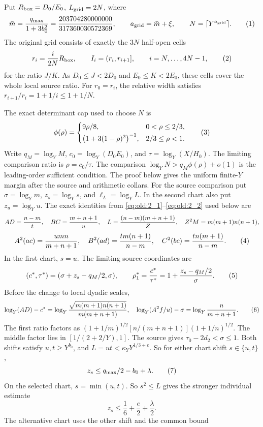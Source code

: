 Put \(R_{\rm box}=D_0/E_0\), \(L_{\rm grid}=2N\), where
\[
 \bar m=\frac{q_{\max}}{1+3b_0^2}
       =\frac{203704280000000}{317360030572369},\qquad
 a_{\rm grid}=\bar m+\xi,\qquad N=\lceil Y^{a_{\rm grid}}\rceil.
\AutoTag{eq:old:7_6}
\]
The original grid consists of exactly the \(3N\) half-open cells
\[
 r_i=\frac{i}{2N}R_{\rm box},\qquad I_i=(r_i,r_{i+1}],
 \qquad i=N,\ldots,4N-1,
\AutoTag{eq:old:7_7}
\]
for the ratio \(J/K\). As \(D_0\le J<2D_0\) and
\(E_0\le K<2E_0\), these cells cover the whole local source ratio.
For \(r_0=r_i\), the relative width satisfies
\(r_{i+1}/r_i=1+1/i\le1+1/N\).

The exact determinant cap used to choose \(N\) is
\[
 \phi(\rho)=
 \begin{cases}
  9\rho/8,&0<\rho\le2/3,\\[2pt]
  \bigl(1+3(1-\rho)^2\bigr)^{-1},&2/3\le\rho<1.
 \end{cases}
\AutoTag{eq:old:7_8}
\]
Write \(q_M=\log_Y M\), \(c_0=\log_Y(D_0E_0)\), and
\(\tau=\log_Y(X/H_0)\). The limiting comparison ratio is
\(\rho=c_0/\tau\). The comparison
\(\log_YN>q_M\phi(\rho)+o(1)\) is the leading-order sufficient
condition. The proof below gives the uniform finite-\(Y\) margin after
the source and arithmetic collars. For the source comparison put
\(\sigma=\log_Ym\), \(z_s=\log_Ys\), and
\(\ell_L=\log_YL\). In the second chart also put
\(z_u=\log_Yu\). The exact identities from \eqref{eq:old:2_1}--\eqref{eq:old:2_2} used below are
\[
 AD={n-m\over t},\quad BC={m+n+1\over u},\quad
 L={(n-m)(m+n+1)\over Z},\quad Z^2M=m(m+1)n(n+1),
\]
\[
 A^2(ac)={umn\over m+n+1},\quad
 B^2(ad)={tm(n+1)\over n-m},\quad
 C^2(bc)={tn(m+1)\over n-m}.
\AutoTag{eq:old:7_8a}
\]
In the first chart, \(s=u\). The limiting source coordinates are
\[
 (c^*,\tau^*)=(\sigma+z_s-q_M/2,\sigma),
\qquad \rho_1^*={c^*\over\tau^*}
 =1+{z_s-q_M/2\over\sigma}.
\AutoTag{eq:old:7_8b}
\]
Before the change to local dyadic scales,
\[
 \log_Y(AD)-c^*
 =\log_Y{\sqrt{m(m+1)n(n+1)}\over m(m+n+1)},\quad
 \log_Y(A^2f/u)-\sigma=\log_Y{n\over m+n+1}.
\AutoTag{eq:old:7_8c}
\]
The first ratio factors as
\((1+1/m)^{1/2}[n/(m+n+1)](1+1/n)^{1/2}\). The middle
factor lies in \([1/(2+2/Y),1]\). The source gives
\(\tau_0-2d_2<\sigma\le1\). Both shifts satisfy
\(u,t\ge Y^{b_0}\), and
\(L=ut<\kappa_YY^{1/3+e}\). So for either chart shift \(s\in\{u,t\}\),
\[
 z_s\le q_{\max}/2-b_0+\lambda.
\AutoTag{eq:old:7_8b_common}
\]
On the selected chart, \(s=\min(u,t)\). So \(s^2\le L\) gives the stronger
individual estimate
\[
 z_s\le \frac16+\frac e2+\frac\lambda2.
\]
The alternative chart uses the other shift and the common bound
